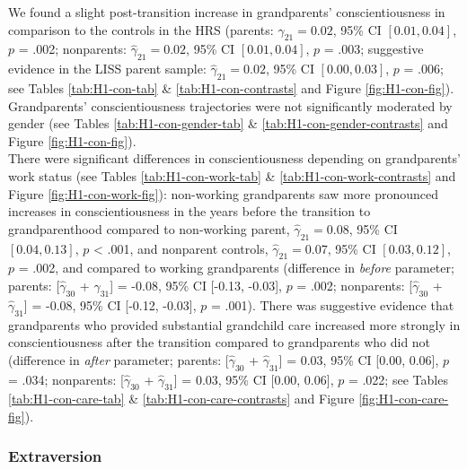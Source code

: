 \documentclass[
  english,
  man, noextraspace]{apa7}
\begin{document}
We found a slight post-transition increase in grandparents' conscientiousness in comparison to the controls in the HRS (parents: \(\hat{\gamma}_{21} = 0.02\), 95\% CI \([0.01, 0.04]\), \(p\) = .002; nonparents: \(\hat{\gamma}_{21} = 0.02\), 95\% CI \([0.01, 0.04]\), \(p\) = .003; suggestive evidence in the LISS parent sample: \(\hat{\gamma}_{21} = 0.02\), 95\% CI \([0.00, 0.03]\), \(p\) = .006; see Tables \ref{tab:H1-con-tab} \& \ref{tab:H1-con-contrasts} and Figure \ref{fig:H1-con-fig}). Grandparents' conscientiousness trajectories were not significantly moderated by gender (see Tables \ref{tab:H1-con-gender-tab} \& \ref{tab:H1-con-gender-contrasts} and Figure \ref{fig:H1-con-fig}).\\
There were significant differences in conscientiousness depending on grandparents' work status (see Tables \ref{tab:H1-con-work-tab} \& \ref{tab:H1-con-work-contrasts} and Figure \ref{fig:H1-con-work-fig}): non-working grandparents saw more pronounced increases in conscientiousness in the years before the transition to grandparenthood compared to non-working parent, \(\hat{\gamma}_{21} = 0.08\), 95\% CI \([0.04, 0.13]\), \(p\) \textless{} .001, and nonparent controls, \(\hat{\gamma}_{21} = 0.07\), 95\% CI \([0.03, 0.12]\), \(p\) = .002, and compared to working grandparents (difference in \emph{before} parameter; parents: {[}\(\hat{\gamma}_{30}\) + \(\hat{\gamma}_{31}\){]} = -0.08, 95\% CI {[}-0.13, -0.03{]}, \(p\) = .002; nonparents: {[}\(\hat{\gamma}_{30}\) + \(\hat{\gamma}_{31}\){]} = -0.08, 95\% CI {[}-0.12, -0.03{]}, \(p\) = .001). There was suggestive evidence that grandparents who provided substantial grandchild care increased more strongly in conscientiousness after the transition compared to grandparents who did not (difference in \emph{after} parameter; parents: {[}\(\hat{\gamma}_{30}\) + \(\hat{\gamma}_{31}\){]} = 0.03, 95\% CI {[}0.00, 0.06{]}, \(p\) = .034; nonparents: {[}\(\hat{\gamma}_{30}\) + \(\hat{\gamma}_{31}\){]} = 0.03, 95\% CI {[}0.00, 0.06{]}, \(p\) = .022; see Tables \ref{tab:H1-con-care-tab} \& \ref{tab:H1-con-care-contrasts} and Figure \ref{fig:H1-con-care-fig}).

\hypertarget{extraversion}{%
\subsubsection{Extraversion}\label{extraversion}}
\end{document}
